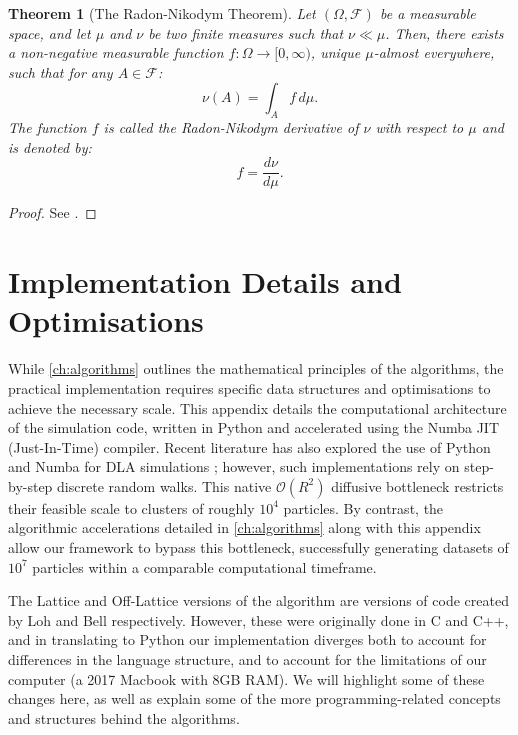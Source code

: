 \documentclass[12pt, a4paper, oneside]{report}
\newtheorem{theorem}{Theorem}[chapter]
\theoremstyle{remark}
\begin{document}
\begin{theorem}[The Radon-Nikodym Theorem]
Let $(\Omega, \mathcal{F})$ be a measurable space, and let $\mu$ and $\nu$ be two finite measures such that $\nu \ll \mu$. Then, there exists a non-negative measurable function $f \colon \Omega \to [0, \infty)$, unique $\mu$-almost everywhere, such that for any $A \in \mathcal{F}$:
\begin{equation*}
    \nu(A) = \int_A f \, d\mu.
\end{equation*}
The function $f$ is called the Radon-Nikodym derivative of $\nu$ with respect to $\mu$ and is denoted by:
\begin{equation*}
    f = \frac{d\nu}{d\mu}.
\end{equation*}
\end{theorem}

\begin{proof}
See \citet[Section 14.13]{Williams1991}.
\end{proof}



\chapter{Implementation Details and Optimisations}
\label{app:implementation}

While \cref{ch:algorithms} outlines the mathematical principles of the algorithms, the practical implementation requires specific data structures and optimisations to achieve the necessary scale. This appendix details the computational architecture of the simulation code, written in Python and accelerated using the Numba JIT (Just-In-Time) compiler. Recent literature has also explored the use of Python and Numba for DLA simulations \cite{herho2026}; however, such implementations rely on step-by-step discrete random walks. This native $\mathcal{O}(R^2)$ diffusive bottleneck restricts their feasible scale to clusters of roughly $10^4$ particles. By contrast, the algorithmic accelerations detailed in \cref{ch:algorithms} along with this appendix allow our framework to bypass this bottleneck, successfully generating datasets of $10^7$ particles within a comparable computational timeframe.

The Lattice and Off-Lattice versions of the algorithm are versions of code created by Loh \cite{Loh2014} and Bell \cite{Bell2019} respectively. However, these were originally done in C and C++, and in translating to Python our implementation diverges both to account for differences in the language structure, and to account for the limitations of our computer (a 2017 Macbook with 8GB RAM). We will highlight some of these changes here, as well as explain some of the more programming-related concepts and structures behind the algorithms.
\end{document}
